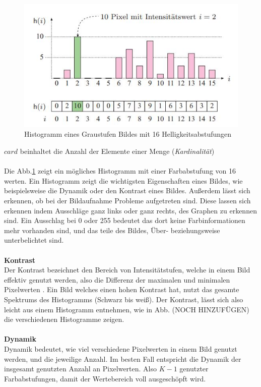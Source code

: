\documentclass[a4paper,12pt,oneside]{article}
\begin{document}
  \begin{figure}
    [h]
    \centering
    \includegraphics[scale=1.0]{Sources/histogramm.jpg}
    \caption{Histogramm eines Graustufen Bildes mit 16 Helligkeitsabstufungen \cite[42]{burger2009digitale}}
    \label{img:histogramm}
  \end{figure}
  $card$ beinhaltet die Anzahl der Elemente einer Menge (\textit{Kardinalität})\\\\
  Die Abb.\ref{img:histogramm} zeigt ein mögliches Histogramm mit einer Farbabstufung von 16 werten. Ein Histogramm zeigt die wichtigsten Eigenschaften eines Bildes, wie beispielsweise die Dynamik oder den Kontrast eines Bildes. Außerdem lässt sich erkennen, ob bei der Bildaufnahme Probleme aufgetreten sind. Diese lassen sich erkennen indem Ausschläge ganz links oder ganz rechts, des Graphen zu erkennen sind. Ein Ausschlag bei 0 oder 255 bedeutet das dort keine Farbinformationen mehr vorhanden sind, und das teile des Bildes, Über- beziehungsweise unterbelichtet sind.\\\\
  \textbf{Kontrast}\label{s.kontrast}\\
  Der Kontrast bezeichnet den Bereich von Intensitätstufen, welche in einem Bild effektiv genutzt werden, also die Differenz der maximalen und minimalen Pixelwerten \cite[44]{burger2009digitale}. Ein Bild welches einen hohen Kontrast hat, nutzt das gesamte Spektrums des Histogramms (Schwarz bis weiß). Der Kontrast, lässt sich also leicht aus einem Histogramm entnehmen, wie in Abb. (NOCH HINZUFÜGEN) die verschiedenen Histogramme zeigen.\\\\
  \textbf{Dynamik}\label{s.dynamik}\\
  Dynamik bedeutet, wie viel verschiedene Pixelwerten in einem Bild genutzt werden, und die jeweilige Anzahl\cite[44]{burger2009digitale}. Im besten Fall entspricht die Dynamik der insgesamt genutzten Anzahl an Pixelwerten. Also $K-1$ genutzter Farbabstufungen, damit der Wertebereich voll ausgeschöpft wird.\\\\
\end{document}
